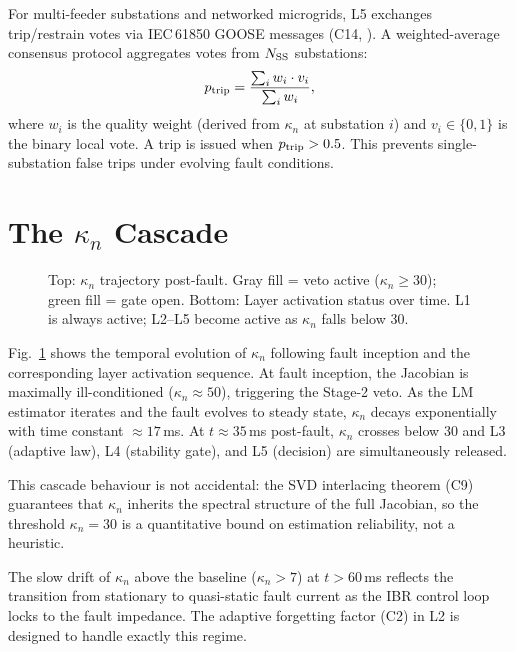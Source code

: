 \documentclass[journal,twoside,10pt]{IEEEtran}
\newcommand{\kappan}{\kappa_{n}}
\begin{document}
For multi-feeder substations and networked microgrids, L5 exchanges
trip/restrain votes via IEC\,61850 GOOSE messages (C14,
\cite{sambps_c14_wa_consensus}).  A weighted-average consensus
protocol aggregates votes from $N_{\rm SS}$ substations:
\[
  p_{\rm trip} = \frac{\sum_i w_i \cdot v_i}{\sum_i w_i},
\]
where $w_i$ is the quality weight (derived from $\kappan$ at
substation $i$) and $v_i \in \{0,1\}$ is the binary local vote.
A trip is issued when $p_{\rm trip} > 0.5$.  This prevents
single-substation false trips under evolving fault conditions.

\section{The $\kappa_n$ Cascade}
\label{sec:kappa_cascade}

\begin{figure}[!t]
\centering
\resizebox{\columnwidth}{!}{%
%
}
\caption{Top: $\kappan$ trajectory post-fault.  Gray fill = veto
  active ($\kappan \geq 30$); green fill = gate open.
  Bottom: Layer activation status over time.  L1 is always active;
  L2--L5 become active as $\kappan$ falls below 30.}
\label{fig:kappa_cascade}
\end{figure}

Fig.~\ref{fig:kappa_cascade} shows the temporal evolution of $\kappan$
following fault inception and the corresponding layer activation
sequence.  At fault inception, the Jacobian is maximally
ill-conditioned ($\kappan \approx 50$), triggering the Stage-2 veto.
As the LM estimator iterates and the fault evolves to steady state,
$\kappan$ decays exponentially with time constant $\approx 17$\,ms.
At $t \approx 35$\,ms post-fault, $\kappan$ crosses below 30 and
L3 (adaptive law), L4 (stability gate), and L5 (decision) are
simultaneously released.

This cascade behaviour is not accidental: the SVD interlacing theorem
(C9) guarantees that $\kappan$ inherits the spectral structure of
the full Jacobian, so the threshold $\kappan = 30$ is a quantitative
bound on estimation reliability, not a heuristic.

The slow drift of $\kappan$ above the baseline ($\kappan > 7$) at
$t > 60$\,ms reflects the transition from stationary to quasi-static
fault current as the IBR control loop locks to the fault impedance.
The adaptive forgetting factor (C2) in L2 is designed to handle
exactly this regime.
\end{document}
